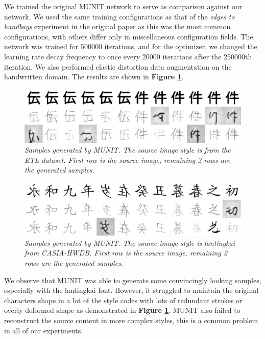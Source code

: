 \documentclass[12pt]{report}
\begin{document}
We trained the original MUNIT\cite{munit} network to serve as comparison against our network. We used the same training configurations as that of the \textit{edges to handbags} experiment in the original paper as this was the most common configurations, with others differ only in miscellaneous configuration fields. The network was trained for 500000 iterations, and for the optimizer, we changed the learning rate decay frequency to once every 20000 iterations after the 250000th iteration. We also performed elastic distortion data augmentation on the handwritten domain. The results are shown in \textbf{Figure \ref{fig:munit-results}}.

\begin{figure}[H]
	\centering
	\includegraphics[scale=0.2]{munit-results}
	\caption{\textit{Samples generated by MUNIT\cite{munit}. The source image style is from the ETL dataset. First row is the source image, remaining 2 rows are the generated samples.}}
	\label{fig:munit-results}
\end{figure}

\begin{figure}[H]
	\centering
	\includegraphics[scale=0.2]{munit-results-2}
	\caption{\textit{Samples generated by MUNIT\cite{munit}. The source image style is lantingkai from CASIA-HWDB\cite{casia}. First row is the source image, remaining 2 rows are the generated samples. }}
	\label{fig:munit-results-2}
\end{figure}

We observe that MUNIT was able to generate some convincingly looking samples, especially with the lantingkai font. However, it struggled to maintain the original characters shape in a lot of the style codes with lots of redundant strokes or overly deformed shape as demonstrated in \textbf{Figure \ref{fig:munit-results}}. MUNIT also failed to reconstruct the source content in more complex styles, this is a common problem in all of our experiments.
\end{document}
